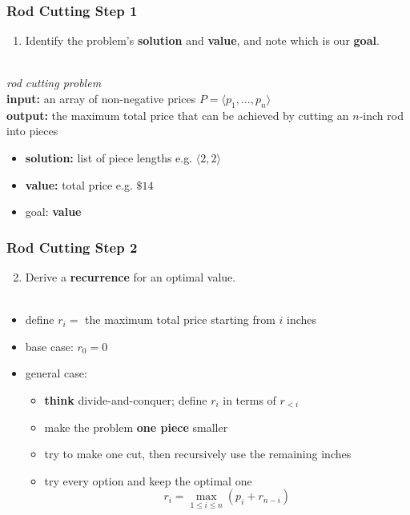 \documentclass{beamer}
\newcommand{\stanza}{ \\~\ }
\begin{document}
\begin{frame} \frametitle{Rod Cutting Step 1}
\begin{enumerate}
  \item Identify the problem's \textbf{solution} and \textbf{value}, and note which is our \textbf{goal}.
  \stanza
\end{enumerate}
\emph{rod cutting problem} \\
\textbf{input:} an array of non-negative prices $P=\langle p_1, \ldots, p_n \rangle$ \\
\textbf{output:} the maximum total price that can be achieved by cutting an $n$-inch rod into pieces
\begin{itemize}
  \item \textbf{solution:} list of piece lengths e.g. $\langle 2, 2 \rangle$
  \item \textbf{value:} total price e.g. $\$14$
  \item goal: \textbf{value}
\end{itemize}
\end{frame}

\begin{frame} \frametitle{Rod Cutting Step 2}
  \begin{enumerate}
    \setcounter{enumi}{1}
    \item Derive a \textbf{recurrence} for an optimal value.
    \stanza
  \end{enumerate}

  \begin{itemize}
    \item define $r_i = $ the maximum total price starting from $i$ inches
    \item base case: $r_0 = 0$
    \item general case:
    \begin{itemize}
      \item \textbf{think} divide-and-conquer; define $r_i$ in terms of $r_{<i}$
      \item make the problem \textbf{one piece} smaller
      \item try to make one cut, then recursively use the remaining inches
      \item try every option and keep the optimal one
      \[ r_i = \max_{1 \leq i \leq n} (p_i + r_{n-i}) \]
    \end{itemize}
  \end{itemize}
\end{frame}
  
\end{document}
